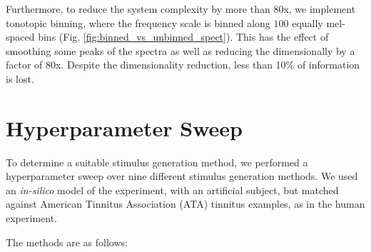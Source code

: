 \documentclass[journal]{IEEEtran}
\begin{document}
Furthermore, to reduce the system complexity by more than 80x,
we implement tonotopic binning, where the frequency scale is binned
along $100$ equally mel-spaced bins (Fig. \ref{fig:binned_vs_unbinned_spect}).
This has the effect of smoothing some peaks of the spectra
as well as reducing the dimensionally by a factor of 80x.
Despite the dimensionality reduction, less than 10\% of information is lost.

\section{Hyperparameter Sweep}

To determine a suitable stimulus generation method,
we performed a hyperparameter sweep over
nine different stimulus generation methods.
We used an \textit{in-silico} model of the experiment,
with an artificial subject, but matched against American Tinnitus Association (ATA) tinnitus examples,
as in the human experiment.

The methods are as follows:
\end{document}
